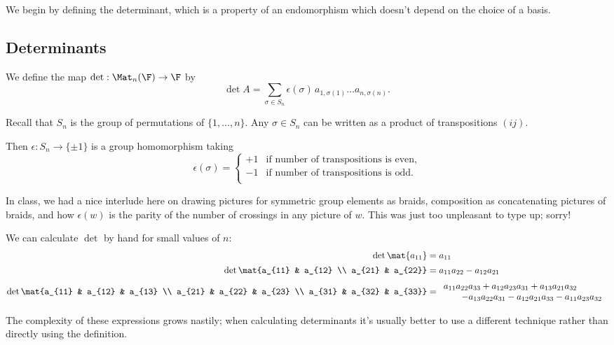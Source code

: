 We begin by defining the determinant, which is a property of an endomorphism which doesn't depend on the choice of a basis.

\subsection{Determinants} %
\label{sub:determinants}

\begin{definition}
	We define the map $\det:\Mat_n(\F) \to \F$ by %
	\begin{equation*}
		\det A=\sum_{\sigma\in S_n} \epsilon(\sigma)\,a_{1,\sigma(1)}\ldots a_{n,\sigma(n)}.
	\end{equation*}

\end{definition}

Recall that $S_n$ is the group of permutations of $\{1,\ldots,n\}$.
Any $\sigma \in S_n$ can be written as a product of transpositions $(i j)$.

Then $\epsilon:S_n\to\{\pm1\}$ is a group homomorphism taking
\begin{equation*}
	\epsilon(\sigma) =
	\begin{cases}
		+1 & \text{if number of transpositions is even,} \\ %
		-1 & \text{if number of transpositions is odd.} \\ %
	\end{cases}
\end{equation*}

In class, we had a nice interlude here on drawing pictures for symmetric group elements as braids, composition as concatenating pictures of braids, and how $\epsilon(w)$ is the parity of the number of crossings in any picture of $w$. This was just too unpleasant to type up; sorry!


\begin{example}
	We can calculate $\det$ by hand for small values of $n$: %
	\begin{align*}
		\det \mat{a_{11}}
			&= a_{11} \\[1.5pt]
		\det \mat{a_{11} & a_{12} \\ a_{21} & a_{22}}
			&= a_{11} a_{22} - a_{12} a_{21} \\[1.5pt] %
		\det \mat{a_{11} & a_{12} & a_{13} \\ a_{21} & a_{22} & a_{23} \\ a_{31} & a_{32} & a_{33}}
			&=
			\begin{array}{l}
				a_{11} a_{22} a_{33}
				+ a_{12} a_{23} a_{31}
				+ a_{13} a_{21} a_{32} \\ \qquad
				- a_{13} a_{22} a_{31}
				- a_{12} a_{21} a_{33}
				- a_{11} a_{23} a_{32} %
			\end{array}
	\end{align*}
\end{example}
	The complexity of these expressions grows nastily; when calculating determinants it's usually better to use a different technique rather than directly using the definition. %


